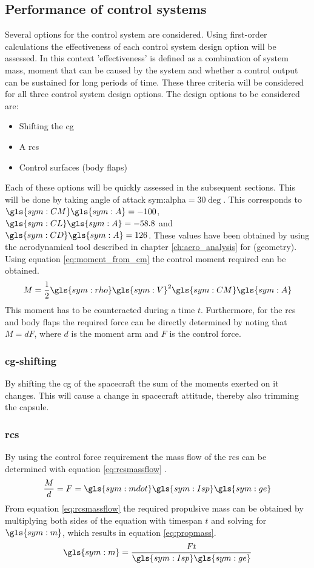 \subsection{Performance of control systems}
 \label{sec:astroref}
Several options for the control system are considered. Using first-order calculations the effectiveness of each control system design option will be assessed. In this context 'effectiveness' is defined as a combination of system mass, moment that can be caused by the system and whether a control output can be sustained for long periods of time. These three criteria will be considered for all three control system design options. The design options to be considered are:
\begin{itemize}
	\item Shifting the \acrfull{cg}
	\item A \acrfull{rcs}
	\item Control surfaces (body flaps)
\end{itemize}
Each of these options will be quickly assessed in the subsequent sections. This will be done by taking angle of attack \gls{sym:alpha}$=30\deg$. This corresponds to $\gls{sym:CM}\gls{sym:A}=-100$, $\gls{sym:CL}\gls{sym:A}=-58.8$ and $\gls{sym:CD}\gls{sym:A}=126$. These values have been obtained by using the aerodynamical tool described in chapter \ref{ch:aero_analysis} for (geometry). Using equation \ref{eq:moment_from_cm} the control moment required can be obtained.
\begin{equation}
M=\frac{1}{2}\gls{sym:rho}\gls{sym:V}^{2}\gls{sym:CM}\gls{sym:A}
\label{eq:moment_from_cm}
\end{equation}
This moment has to be counteracted during a time $t$. Furthermore, for the \gls{rcs} and body flaps the required force can be directly determined by noting that $M=dF$, where $d$ is the moment arm and $F$ is the control force. 

\subsubsection{\gls{cg}-shifting}
By shifting the \acrlong{cg} of the spacecraft the sum of the moments exerted on it changes. This will cause a change in spacecraft attitude, thereby also trimming the capsule.

\subsubsection{\acrlong{rcs}}
By using the control force requirement the mass flow of the \acrlong{rcs} can be determined with equation \ref{eq:rcsmassflow} \cite{Allen2012}.
\begin{equation}
\frac{M}{d}=F=\gls{sym:mdot}\gls{sym:Isp}\gls{sym:ge}
\label{eq:rcsmassflow}
\end{equation}
From equation \ref{eq:rcsmassflow} the required propulsive mass can be obtained by multiplying both sides of the equation with timespan $t$ and solving for $\gls{sym:m}$, which results in equation \ref{eq:propmass}.
\begin{equation}
\gls{sym:m}=\frac{Ft}{\gls{sym:Isp}\gls{sym:ge}}
\label{eq:propmass}
\end{equation}

